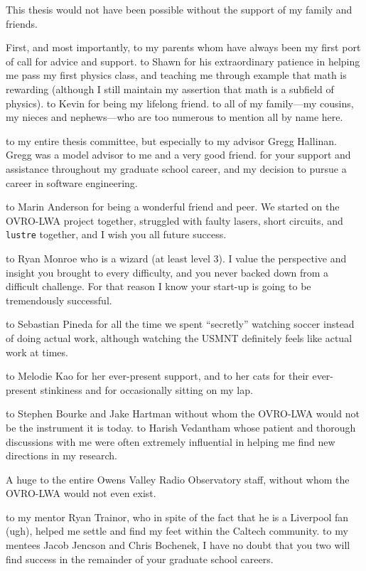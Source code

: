 \documentclass[12pt]{caltech_thesis}
\begin{document}
\begin{acknowledgements}
    This thesis would not have been possible without the support of my family and friends.

    First, and most importantly, \ty to my parents whom have always been my first port of call for
    advice and support.  \Ty to Shawn for his extraordinary patience in helping me pass my first
    physics class, and teaching me through example that math is rewarding (although I still maintain
    my assertion that math is a subfield of physics).  \Ty to Kevin for being my lifelong friend.
    \Ty to all of my family---my cousins, my nieces and nephews---who are too numerous to mention
    all by name here.

    \Ty to my entire thesis committee, but especially to my advisor Gregg Hallinan. Gregg was a
    model advisor to me and a very good friend. \Ty for your support and assistance throughout my
    graduate school career, and my decision to pursue a career in software engineering.

    \Ty to Marin Anderson for being a wonderful friend and peer. We started on the OVRO-LWA project
    together, struggled with faulty lasers, short circuits, and \texttt{lustre} together, and I wish
    you all future success.

    \Ty to Ryan Monroe who is a wizard (at least level 3). I value the perspective and insight you
    brought to every difficulty, and you never backed down from a difficult challenge. For that
    reason I know your start-up is going to be tremendously successful.

    \Ty to Sebastian Pineda for all the time we spent ``secretly'' watching soccer instead of doing
    actual work, although watching the USMNT definitely feels like actual work at times.
    
    \Ty to Melodie Kao for her ever-present support, and \ty to her cats for their ever-present
    stinkiness and for occasionally sitting on my lap.
    
    \Ty to Stephen Bourke and Jake Hartman without whom the OVRO-LWA would not be the instrument it
    is today. \Ty to Harish Vedantham whose patient and thorough discussions with me were often
    extremely influential in helping me find new directions in my research.

    A huge \ty to the entire Owens Valley Radio Observatory staff, without whom the OVRO-LWA would
    not even exist.

    \Ty to my mentor Ryan Trainor, who in spite of the fact that he is a Liverpool fan (ugh), helped
    me settle and find my feet within the Caltech community. \Ty to my mentees Jacob Jencson and
    Chris Bochenek, I have no doubt that you two will find success in the remainder of your graduate
    school careers.


\end{acknowledgements}
\end{document}
